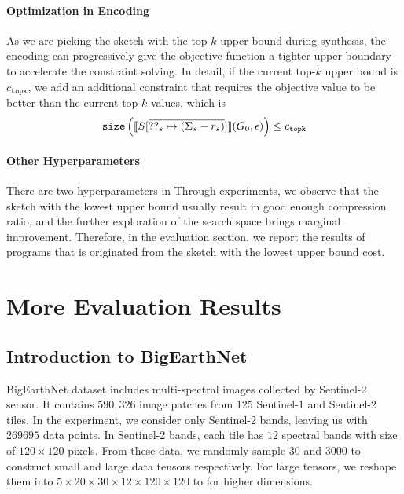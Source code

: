 \paragraph{Optimization in Encoding}
%
As we are picking the sketch with the top-$k$ upper bound during synthesis, the encoding can progressively give the objective function a tighter upper boundary to accelerate the constraint solving.
%
In detail, if the current top-$k$ upper bound is $c_{\mathtt{topk}}$, we add an additional constraint that requires the objective value to be better than the current top-$k$ values, which is
\begin{equation}
\mathtt{size}\left(\llbracket S[\overline{??_s \mapsto (\Sigma_s - r_s)}] \rrbracket(G_0, \epsilon)\right) \leq c_{\mathtt{topk}}
\end{equation}

\paragraph{Other Hyperparameters}
%
There are two hyperparameters in 
Through experiments, we observe that the sketch with the lowest upper bound usually result in good enough compression ratio, and the further exploration of the search space brings marginal improvement.
%
Therefore, in the evaluation section, we report the results of programs that is originated from the sketch with the lowest upper bound cost.

\section{More Evaluation Results}
%
\subsection{Introduction to BigEarthNet}
%
BigEarthNet dataset includes multi-spectral images collected by Sentinel-2 sensor.
%
It contains $590,326$ image patches from 125 Sentinel-1 and Sentinel-2 tiles.
%
In the experiment, we consider only Sentinel-2 bands, leaving us with $269695$ data points.
%
In Sentinel-2 bands, each tile has $12$ spectral bands with size of $120 \times 120$ pixels.
%
From these data, we randomly sample $30$ and $3000$ to construct small and large data tensors respectively.
%
For large tensors, we reshape them into $5 \times 20 \times 30 \times 12 \times 120 \times 120$ to for higher dimensions.

